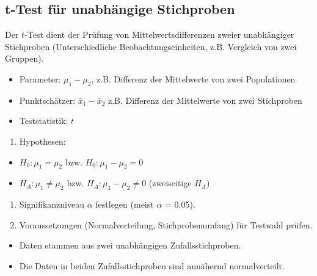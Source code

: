 \documentclass[
]{book}
\providecommand{\tightlist}{%
  \setlength{\itemsep}{0pt}\setlength{\parskip}{0pt}}
\begin{document}
\hypertarget{t-test-fuxfcr-unabhuxe4ngige-stichproben}{%
\subsection{t-Test für unabhängige Stichproben}\label{t-test-fuxfcr-unabhuxe4ngige-stichproben}}

Der \(t\)-Test dient der Prüfung von Mittelwertsdifferenzen zweier unabhängiger Stichproben (Unterschiedliche Beobachtungseinheiten, z.B. Vergleich von zwei Gruppen).

\begin{itemize}
\tightlist
\item
  Parameter: \(\mu_1 - \mu_2\), z.B. Differenz der Mittelwerte von zwei Populationen\\
\item
  Punktschätzer: \(\bar{x}_1 - \bar{x}_2\) z.B. Differenz der Mittelwerte von zwei Stichproben\\
\item
  Teststatistik: \(t\)
\end{itemize}

\begin{enumerate}
\def\labelenumi{\arabic{enumi}.}
\tightlist
\item
  Hypothesen:
\end{enumerate}

\begin{itemize}
\tightlist
\item
  \(H_0: \mu_1 = \mu_2\) bzw. \(H_0: \mu_1 - \mu_2 = 0\)\\
\item
  \(H_A: \mu_1 \neq \mu_2\) bzw. \(H_A: \mu_1 - \mu_2 \neq 0\) (zweiseitige \(H_A\))
\end{itemize}

\begin{enumerate}
\def\labelenumi{\arabic{enumi}.}
\setcounter{enumi}{1}
\item
  Signifikanzniveau \(\alpha\) festlegen (meist \(\alpha\) = 0.05).
\item
  Voraussetzungen (Normalverteilung, Stichprobenumfang) für Testwahl prüfen.
\end{enumerate}

\begin{itemize}
\tightlist
\item
  Daten stammen aus zwei unabhängigen Zufallsstichproben.\\
\item
  Die Daten in beiden Zufallsstichproben sind annähernd normalverteilt.
\end{itemize}
\end{document}
